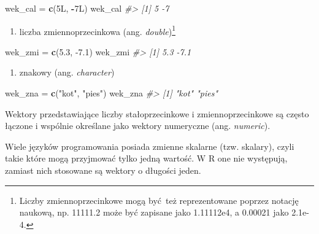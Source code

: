\documentclass[paper=6in:9in,pagesize=pdftex,headinclude=on,footinclude=on,10pt]{scrbook}
\makeatletter
\newenvironment{Shaded}{\begin{snugshade}}{\end{snugshade}}
\newcommand{\CommentTok}[1]{\textcolor[rgb]{0.56,0.35,0.01}{\textit{#1}}}
\newcommand{\FloatTok}[1]{\textcolor[rgb]{0.00,0.00,0.81}{#1}}
\newcommand{\KeywordTok}[1]{\textcolor[rgb]{0.13,0.29,0.53}{\textbf{#1}}}
\newcommand{\NormalTok}[1]{#1}
\newcommand{\OperatorTok}[1]{\textcolor[rgb]{0.81,0.36,0.00}{\textbf{#1}}}
\newcommand{\StringTok}[1]{\textcolor[rgb]{0.31,0.60,0.02}{#1}}
\providecommand{\tightlist}{%
  \setlength{\itemsep}{0pt}\setlength{\parskip}{0pt}}
\newenvironment{kframe}{%
\medskip{}
\setlength{\fboxsep}{.8em}
 \def\at@end@of@kframe{}%
 \ifinner\ifhmode%
  \def\at@end@of@kframe{\end{minipage}}%
  \begin{minipage}{\columnwidth}%
 \fi\fi%
 \def\FrameCommand##1{\hskip\@totalleftmargin \hskip-\fboxsep
 \colorbox{shadecolor}{##1}\hskip-\fboxsep
     \hskip-\linewidth \hskip-\@totalleftmargin \hskip\columnwidth}%
 \MakeFramed {\advance\hsize-\width
   \@totalleftmargin\z@ \linewidth\hsize
   \@setminipage}}%
 {\par\unskip\endMakeFramed%
 \at@end@of@kframe}
\newenvironment{rmdblock}[1]
  {
  \begin{itemize}
  \renewcommand{\labelitemi}{
    \raisebox{-.7\height}[0pt][0pt]{
      {\setkeys{Gin}{width=3em,keepaspectratio}\texttt{[image: images/\#1]}}
    }
  }
  \setlength{\fboxsep}{1em}
  \begin{kframe}
  \item
  }
  {
  \end{kframe}
  \end{itemize}
  }
\newenvironment{rmdinfo}
  {\begin{rmdblock}{compass}}
  {\end{rmdblock}}
\makeatother
\begin{document}
\begin{Shaded}
\begin{Highlighting}[]
\NormalTok{wek_cal =}\StringTok{ }\KeywordTok{c}\NormalTok{(5L, }\OperatorTok{-}\NormalTok{7L)}
\NormalTok{wek_cal}
\CommentTok{#> [1]  5 -7}
\end{Highlighting}
\end{Shaded}

\begin{enumerate}
\def\labelenumi{\arabic{enumi}.}
\setcounter{enumi}{2}
\tightlist
\item
  liczba zmiennoprzecinkowa (ang. \emph{double})\footnote{Liczby zmiennoprzecinkowe mogą być~też reprezentowane poprzez notację naukową, np. 11111.2 może być zapisane jako 1.11112e4, a 0.00021 jako 2.1e-4.}
\end{enumerate}

\begin{Shaded}
\begin{Highlighting}[]
\NormalTok{wek_zmi =}\StringTok{ }\KeywordTok{c}\NormalTok{(}\FloatTok{5.3}\NormalTok{, }\FloatTok{-7.1}\NormalTok{)}
\NormalTok{wek_zmi}
\CommentTok{#> [1]  5.3 -7.1}
\end{Highlighting}
\end{Shaded}

\begin{enumerate}
\def\labelenumi{\arabic{enumi}.}
\setcounter{enumi}{3}
\tightlist
\item
  znakowy (ang. \emph{character})
\end{enumerate}

\begin{Shaded}
\begin{Highlighting}[]
\NormalTok{wek_zna =}\StringTok{ }\KeywordTok{c}\NormalTok{(}\StringTok{"kot"}\NormalTok{, }\StringTok{"pies"}\NormalTok{)}
\NormalTok{wek_zna}
\CommentTok{#> [1] "kot"  "pies"}
\end{Highlighting}
\end{Shaded}

Wektory przedstawiające liczby stałoprzecinkowe i zmiennoprzecinkowe są często łączone i wspólnie określane jako wektory numeryczne (ang. \emph{numeric}).

\begin{rmdinfo}
\begin{rmdinfo}

Wiele języków programowania posiada zmienne skalarne (tzw. skalary), czyli takie które mogą przyjmować tylko jedną wartość.
W R one nie występują, zamiast nich stosowane są wektory o długości jeden.

\end{rmdinfo}
\end{rmdinfo}
\end{document}
